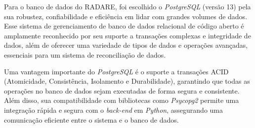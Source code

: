 Para o banco de dados do RADARE, foi escolhido o \textit{PostgreSQL} (versão 13) pela sua robustez, confiabilidade e eficiência em lidar com grandes volumes de dados. Esse sistema de gerenciamento de banco de dados relacional de código aberto é amplamente reconhecido por seu suporte a transações complexas e integridade de dados, além de oferecer uma variedade de tipos de dados e operações avançadas, essenciais para um sistema de reconciliação de dados.

Uma vantagem importante do \textit{PostgreSQL} é o suporte a transações ACID (Atomicidade, Consistência, Isolamento e Durabilidade), garantindo que todas as operações no banco de dados sejam executadas de forma segura e consistente. Além disso, sua compatibilidade com bibliotecas como \textit{Psycopg2} permite uma integração rápida e segura com o \textit{back-end} em \textit{Python}, assegurando uma comunicação eficiente entre o sistema e o banco de dados.
